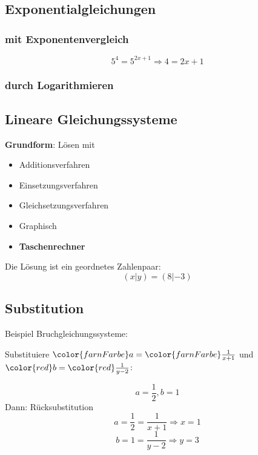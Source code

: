 \begin{multicols}{2}
\begin{tabular}{rcl}
\end{tabular}

\subsection*{Exponentialgleichungen}
\subsubsection*{mit Exponentenvergleich}

$$5^4 = 5^{2x+1} \Longrightarrow  4=2x+1$$

\subsubsection*{durch Logarithmieren}


\subsection*{Lineare Gleichungssysteme}
\textbf{Grundform}:
Lösen mit
\begin{itemize}
\item Additionsverfahren
\item Einsetzungsverfahren
\item Gleichsetzungsverfahren
\item Graphisch
\item \textbf{Taschenrechner}
\end{itemize}
Die Lösung ist ein geordnetes Zahlenpaar:
$$(x | y) = (8 | -3)$$


\forceCB
\keinHeaderUndKeinFooter{}

\subsection*{Substitution}
Beispiel Bruchgleichungssysteme:

Substituiere
${\color{farnFarbe}a}={\color{farnFarbe}\frac1{x+1}}$ und
${\color{red}b} = {\color{red}\frac1{y-2}}$:


$$a=\frac12, b=1$$
Dann: Rücksubstitution
$$a=\frac12=\frac{1}{x+1} \Longrightarrow  x=1$$
$$b=1=\frac{1}{y-2} \Longrightarrow  y=3$$



\end{multicols}
